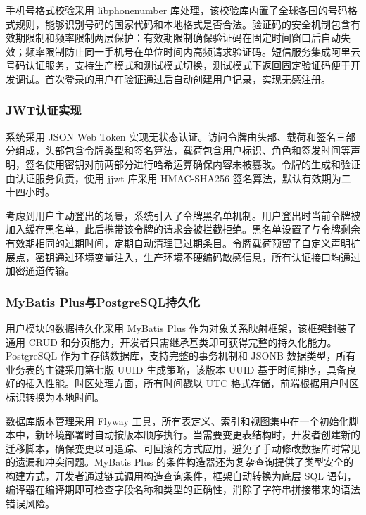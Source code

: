 \par 手机号格式校验采用 libphonenumber 库处理，该校验库内置了全球各国的号码格式规则，能够识别号码的国家代码和本地格式是否合法。验证码的安全机制包含有效期限制和频率限制两层保护：有效期限制确保验证码在固定时间窗口后自动失效；频率限制防止同一手机号在单位时间内高频请求验证码。短信服务集成阿里云号码认证服务，支持生产模式和测试模式切换，测试模式下返回固定验证码便于开发调试。首次登录的用户在验证通过后自动创建用户记录，实现无感注册。

\subsubsection{JWT认证实现}

\par 系统采用 JSON Web Token 实现无状态认证。访问令牌由头部、载荷和签名三部分组成，头部包含令牌类型和签名算法，载荷包含用户标识、角色和签发时间等声明，签名使用密钥对前两部分进行哈希运算确保内容未被篡改。令牌的生成和验证由认证服务负责，使用 jjwt 库采用 HMAC-SHA256 签名算法，默认有效期为二十四小时。

\par 考虑到用户主动登出的场景，系统引入了令牌黑名单机制。用户登出时当前令牌被加入缓存黑名单，此后携带该令牌的请求会被拦截拒绝。黑名单设置了与令牌剩余有效期相同的过期时间，定期自动清理已过期条目。令牌载荷预留了自定义声明扩展点，密钥通过环境变量注入，生产环境不硬编码敏感信息，所有认证接口均通过加密通道传输。

\subsubsection{MyBatis Plus与PostgreSQL持久化}

\par 用户模块的数据持久化采用 MyBatis Plus 作为对象关系映射框架，该框架封装了通用 CRUD 和分页能力，开发者只需继承基类即可获得完整的持久化能力。PostgreSQL 作为主存储数据库，支持完整的事务机制和 JSONB 数据类型，所有业务表的主键采用第七版 UUID 生成策略，该版本 UUID 基于时间排序，具备良好的插入性能。时区处理方面，所有时间戳以 UTC 格式存储，前端根据用户时区标识转换为本地时间。

\par 数据库版本管理采用 Flyway 工具，所有表定义、索引和视图集中在一个初始化脚本中，新环境部署时自动按版本顺序执行。当需要变更表结构时，开发者创建新的迁移脚本，确保变更以可追踪、可回滚的方式应用，避免了手动修改数据库时常见的遗漏和冲突问题。MyBatis Plus 的条件构造器还为复杂查询提供了类型安全的构建方式，开发者通过链式调用构造查询条件，框架自动转换为底层 SQL 语句，编译器在编译期即可检查字段名称和类型的正确性，消除了字符串拼接带来的语法错误风险。

